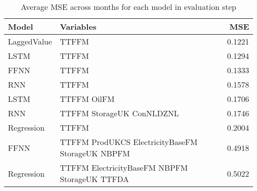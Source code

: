 \begin{table}[h!]
\centering
 \begin{adjustbox}{max width=\textwidth}
\begin{tabular}{llr}
  \hline
Model & Variables & MSE \\ 
  \hline
LaggedValue & TTFFM  & 0.1221 \\ 
  LSTM & TTFFM  & 0.1294 \\ 
  FFNN & TTFFM  & 0.1333 \\ 
  RNN & TTFFM  & 0.1578 \\ 
  LSTM & TTFFM OilFM & 0.1706 \\ 
  RNN & TTFFM StorageUK ConNLDZNL & 0.1746 \\ 
  Regression & TTFFM  & 0.2004 \\ 
  FFNN & TTFFM ProdUKCS ElectricityBaseFM StorageUK NBPFM & 0.4918 \\ 
  Regression & TTFFM ElectricityBaseFM NBPFM StorageUK TTFDA & 0.5022 \\ 
   \hline
 \end{tabular}
\end{adjustbox}
\caption{Average MSE across months for each model in evaluation step} 
\label{tab:level.eval.short}
\end{table}

